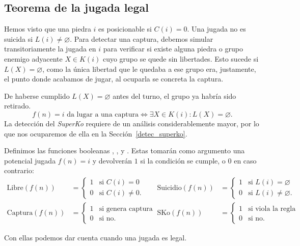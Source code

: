 \subsection{Teorema de la jugada legal}

Hemos visto que una piedra $i$ es posicionable si $C(i)=0$. Una jugada no es suicida si $L(i) \neq \varnothing$. Para detectar una captura, debemos simular transitoriamente la jugada en $i$ para verificar si existe alguna piedra o grupo enemigo adyacente $X \in K(i)$ cuyo grupo se quede sin libertades. Esto sucede si $L(X)=\varnothing$, como la única libertad que le quedaba a ese grupo era, justamente, el punto donde acabamos de jugar, al ocuparla se concreta la captura. 

De haberse cumplido $L(X)=\varnothing$ antes del turno, el grupo ya habría sido retirado.
\[f(n) = i \text{ da lugar a una captura} \iff \exists X \in K(i) : L(X)=\varnothing.\]
La detección del \textit{SuperKo} requiere de un análisis considerablemente mayor, por lo que nos ocuparemos de ella en la Sección~\ref{detec_superko}.

Definimos las funciones booleanas , ,  y . Estas tomarán como argumento una potencial jugada $f(n) = i$ y devolverán $1$ si la condición se cumple, o $0$ en caso contrario:
\begin{align*}
	\text{Libre}(f(n)) &= \begin{cases}
		1 & \text{si } C(i) = 0 \\
		0 & \text{si } C(i) \neq 0.
	\end{cases} & \quad
	\text{Suicidio}(f(n)) &= \begin{cases}
		1 & \text{si } L(i) = \varnothing \\
		0 & \text{si } L(i) \neq \varnothing.
	\end{cases} \\[1em]
	\text{Captura}(f(n)) &= \begin{cases}
		1 & \text{si genera captura} \\
		0 & \text{si no}.
	\end{cases} & \quad
	\text{SKo}(f(n)) &= \begin{cases}
		1 & \text{si viola la regla} \\
		0 & \text{si no}.
	\end{cases}
\end{align*}

Con ellas podemos dar cuenta cuando una jugada es legal.

